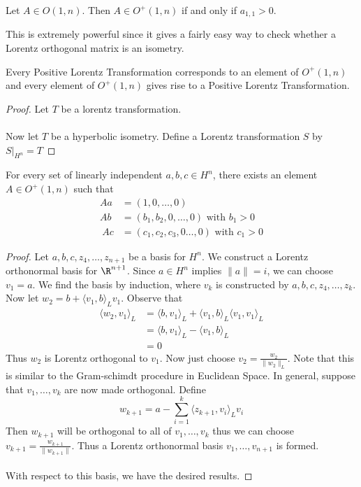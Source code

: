 \documentclass[a4paper]{article}
\begin{document}
\begin{lmm}{}{} Let $A\in O(1,n)$. Then $A\in O^+(1,n)$ if and only if $a_{1,1}>0$. 
\end{lmm}

This is extremely powerful since it gives a fairly easy way to check whether a Lorentz orthogonal matrix is an isometry. 

\begin{crl}{}{} Every Positive Lorentz Transformation corresponds to an element of $O^+(1,n)$ and every element of $O^+(1,n)$ gives rise to a Positive Lorentz Transformation. \tcbline
\begin{proof}
Let $T$ be a lorentz transformation. \\~\\
Now let $T$ be a hyperbolic isometry. Define a Lorentz transformation $S$ by $S|_{H^n}=T$
\end{proof}
\end{crl}

\begin{lmm}{}{} For every set of linearly independent $a,b,c\in H^n$, there exists an element $A\in O^+(1,n)$ such that 
\begin{align*}
Aa&=(1,0,\dots,0)\\
Ab&=(b_1,b_2,0,\dots,0)\text{ with }b_1>0\\\
Ac&=(c_1,c_2,c_3,0\dots,0)\text{ with }c_1>0
\end{align*} \tcbline
\begin{proof}
Let $a,b,c,z_4,\dots,z_{n+1}$ be a basis for $H^n$. We construct a Lorentz orthonormal basis for $\R^{n+1}$. Since $a\in H^n$ implies $\|a\|=i$, we can choose $v_1=a$. We find the basis by induction, where $v_k$ is constructed by $a,b,c,z_4,\dots,z_k$. Now let $w_2=b+\langle v_1,b\rangle_L v_1$. Observe that 
\begin{align*}
\langle w_2,v_1\rangle_L&=\langle b,v_1\rangle_L+\langle v_1,b\rangle_L\langle v_1,v_1\rangle_L\\
&=\langle b,v_1\rangle_L-\langle v_1,b\rangle_L\tag{$\langle v_1,v_1\rangle_L=-1$}\\
&=0
\end{align*}
Thus $w_2$ is Lorentz orthogonal to $v_1$. Now just choose $v_2=\frac{w_2}{\|w_2\|_L}$. Note that this is similar to the Gram-schimdt procedure in Euclidean Space. In general, suppose that $v_1,\dots,v_k$ are now made orthogonal. Define $$w_{k+1}=a-\sum_{i=1}^k\langle z_{k+1},v_i\rangle_Lv_i$$ Then $w_{k+1}$ will be orthogonal to all of $v_1,\dots,v_k$ thus we can choose $v_{k+1}=\frac{w_{k+1}}{\|w_{k+1}\|}$. Thus a Lorentz orthonormal basis $v_1,\dots,v_{n+1}$ is formed. \\~\\
With respect to this basis, we have the desired results. 
\end{proof}
\end{lmm}
\end{document}
